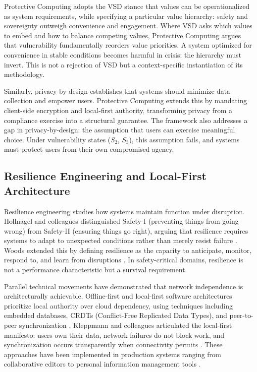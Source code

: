 \documentclass[acmsmall,review]{acmart}
\begin{document}
Protective Computing adopts the VSD stance that values can be operationalized as system requirements, while specifying a particular value hierarchy: safety and sovereignty outweigh convenience and engagement. Where VSD asks which values to embed and how to balance competing values, Protective Computing argues that vulnerability fundamentally reorders value priorities. A system optimized for convenience in stable conditions becomes harmful in crisis; the hierarchy must invert. This is not a rejection of VSD but a context-specific instantiation of its methodology.

Similarly, privacy-by-design establishes that systems should minimize data collection and empower users. Protective Computing extends this by mandating client-side encryption and local-first authority, transforming privacy from a compliance exercise into a structural guarantee. The framework also addresses a gap in privacy-by-design: the assumption that users can exercise meaningful choice. Under vulnerability states ($S_2$, $S_3$), this assumption fails, and systems must protect users from their own compromised agency.

\subsection{Resilience Engineering and Local-First Architecture}

Resilience engineering studies how systems maintain function under disruption. Hollnagel and colleagues distinguished Safety-I (preventing things from going wrong) from Safety-II (ensuring things go right), arguing that resilience requires systems to adapt to unexpected conditions rather than merely resist failure \cite{Hollnagel2006,Hollnagel2014}. Woods extended this by defining resilience as the capacity to anticipate, monitor, respond to, and learn from disruptions \cite{Woods2015}. In safety-critical domains, resilience is not a performance characteristic but a survival requirement.

Parallel technical movements have demonstrated that network independence is architecturally achievable. Offline-first and local-first software architectures prioritize local authority over cloud dependency, using techniques including embedded databases, CRDTs (Conflict-Free Replicated Data Types), and peer-to-peer synchronization \cite{Hughes2015,Shapiro2011,OBeirne2018}. Kleppmann and colleagues articulated the local-first manifesto: users own their data, network failures do not block work, and synchronization occurs transparently when connectivity permits \cite{Kleppmann2019}. These approaches have been implemented in production systems ranging from collaborative editors to personal information management tools \cite{Gruntz2016,Hegeman2022}.
\end{document}

